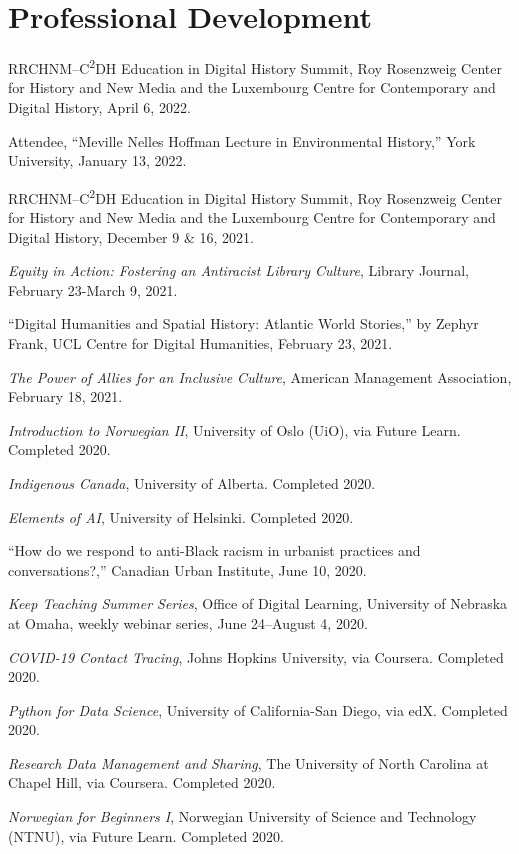 \section{Professional Development}\label{professional-development}

RRCHNM--C\textsuperscript{2}DH Education in Digital History Summit, Roy
Rosenzweig Center for History and New Media and the Luxembourg Centre
for Contemporary and Digital History, April 6, 2022.

Attendee, ``Meville Nelles Hoffman Lecture in Environmental History,''
York University, January 13, 2022.

RRCHNM--C\textsuperscript{2}DH Education in Digital History Summit, Roy
Rosenzweig Center for History and New Media and the Luxembourg Centre
for Contemporary and Digital History, December 9 \& 16, 2021.

\emph{Equity in Action: Fostering an Antiracist Library Culture},
Library Journal, February 23-March 9, 2021.

``Digital Humanities and Spatial History: Atlantic World Stories,'' by
Zephyr Frank, UCL Centre for Digital Humanities, February 23, 2021.

\emph{The Power of Allies for an Inclusive Culture}, American Management
Association, February 18, 2021.

\emph{Introduction to Norwegian II}, University of Oslo (UiO), via
Future Learn. Completed 2020.

\emph{Indigenous Canada}, University of Alberta. Completed 2020.

\emph{Elements of AI}, University of Helsinki. Completed 2020.

``How do we respond to anti-Black racism in urbanist practices and
conversations?,'' Canadian Urban Institute, June 10, 2020.

\emph{Keep Teaching Summer Series}, Office of Digital Learning,
University of Nebraska at Omaha, weekly webinar series, June 24--August
4, 2020.

\emph{COVID-19 Contact Tracing}, Johns Hopkins University, via Coursera.
Completed 2020.

\emph{Python for Data Science}, University of California-San Diego, via
edX. Completed 2020.

\emph{Research Data Management and Sharing}, The University of North
Carolina at Chapel Hill, via Coursera. Completed 2020.

\emph{Norwegian for Beginners I}, Norwegian University of Science and
Technology (NTNU), via Future Learn. Completed 2020.

